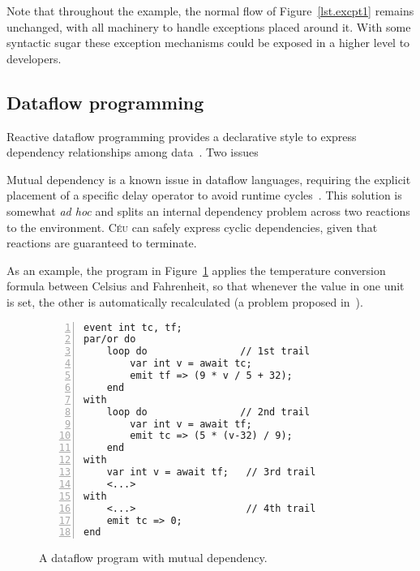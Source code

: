 \documentclass{acm_proc_article-sp}
\newcommand{\CEU}{\textsc{C\'{e}u}\xspace}
\newcommand{\code}[1] {{\small{\texttt{#1}}}}
\newcommand{\1}{\;}
\newcommand{\2}{\;\;}
\newcommand{\3}{\;\;\;}
\newcommand{\5}{\;\;\;\;\;}
\begin{document}
Note that throughout the example, the normal flow of Figure~\ref{lst.excpt1} 
remains unchanged, with all machinery to handle exceptions placed around it.
With some syntactic sugar these exception mechanisms could be exposed in a 
higher level to developers.

\subsection{Dataflow programming}
\label{sec.adv.frp}

\begin{comment}

terminate), which is fundamental to enable multiple dependencies from the -same 
source in dataflow programming (to be discussed in
-Sections~\ref{sec.sem}~and~\ref{sec.adv.frp}).

alternative to Esterel's abortion primitive that is required for dataflow 
support.
This modification makes lines of executions to rejoin in an equivalent way to 
topological traversal in dependency graphs of dataflow 
languages~\cite{rp.twelve,frp.survey}.
%
We also show that, based on the stacked execution for internal events, \CEU can 
describe mutual data dependency without requiring an explicit \emph{delay} 
operator to break cycles~\cite{frtime.embedding,luagravity.sblp}.
\end{comment}


Reactive dataflow programming provides a declarative style to express 
dependency relationships among data~\cite{frp.survey}.
%
Two issues

Mutual dependency is a known issue in dataflow languages, requiring the 
explicit placement of a specific delay operator to avoid runtime
cycles~\cite{frtime.embedding,luagravity.sblp}.
This solution is somewhat \emph{ad hoc} and splits an internal dependency 
problem across two reactions to the environment.
%
\CEU can safely express cyclic dependencies, given that reactions are 
guaranteed to terminate.

As an example, the program in Figure~\ref{lst.frp2} applies the temperature 
conversion formula between Celsius and Fahrenheit, so that whenever the value 
in one unit is set, the other is automatically recalculated (a problem proposed 
in~\cite{frp.survey}).

\begin{figure}[t]
\begin{lstlisting}[numbers=left,xleftmargin=2em]
event int tc, tf;
par/or do
    loop do                // 1st trail
        var int v = await tc;
        emit tf => (9 * v / 5 + 32);
    end
with
    loop do                // 2nd trail
        var int v = await tf;
        emit tc => (5 * (v-32) / 9);
    end
with
    var int v = await tf;   // 3rd trail
    <...>
with
    <...>                   // 4th trail
    emit tc => 0;
end
\end{lstlisting}
\caption{ A dataflow program with mutual dependency.
\label{lst.frp2}
}
\end{figure}
\end{document}
